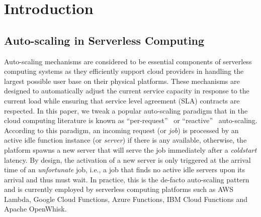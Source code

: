 


\section{Introduction}

\subsection{Auto-scaling in Serverless Computing}

Auto-scaling mechanisms are considered to be essential components of serverless computing systems as they efficiently support cloud providers in handling the largest possible user base on their physical platforms.
These mechanisms are designed to automatically adjust the current service capacity in response to the current load while ensuring that service level agreement (SLA) contracts are respected.
In this paper, we tweak a popular auto-scaling paradigm that in the cloud computing literature is known as ``per-request''~\cite{scaleperrequest,ASLANPOUR2024266,Anselmi24} or ``reactive''~\cite{DOGANI2024104837} auto-scaling. According to this paradigm, an incoming request (or \emph{job}) is processed by an active idle function instance (or \emph{server}) if there is any available,
otherwise, the platform spawns a new server that will serve the job immediately after a \emph{coldstart} latency.
By design, the activation of a new server is only triggered at the arrival time of an \emph{unfortunate} job, i.e., a job that finds no active idle servers upon its arrival and thus must wait.
In practice, this is the de-facto auto-scaling pattern and is currently employed by serverless computing platforms such as AWS Lambda, Google Cloud Functions, Azure Functions, IBM Cloud Functions and Apache OpenWhisk.

